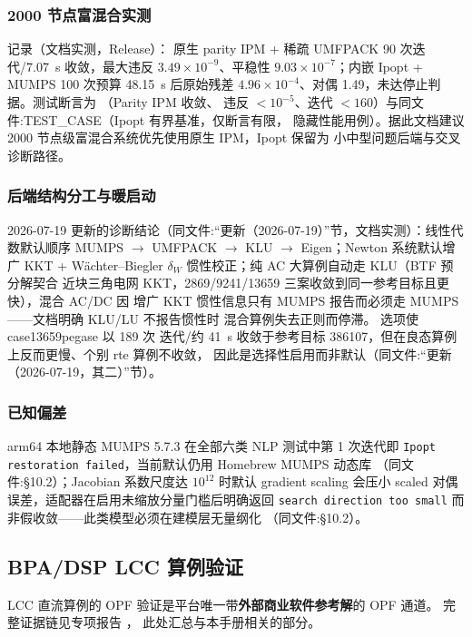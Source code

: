 \subsubsection*{2000 节点富混合实测}
 记录（文档实测，Release）：
原生 parity IPM + 稀疏 UMFPACK 90 次迭代/7.07~s 收敛，最大违反
$3.49\times10^{-9}$、平稳性 $9.03\times10^{-7}$；内嵌 Ipopt + MUMPS 100 次预算
48.15~s 后原始残差 $4.96\times10^{-4}$、对偶 1.49，未达停止判据。测试断言为
（Parity IPM 收敛、
违反 $<10^{-5}$、迭代 $<160$）与同文件:TEST\_CASE（Ipopt 有界基准，仅断言有限，
隐藏性能用例）。据此文档建议 2000 节点级富混合系统优先使用原生 IPM，Ipopt 保留为
小中型问题后端与交叉诊断路径。

\subsubsection*{后端结构分工与暖启动}
2026-07-19 更新的诊断结论（同文件:“更新（2026-07-19）”节，文档实测）：线性代数默认顺序
MUMPS $\to$ UMFPACK $\to$ KLU $\to$ Eigen；Newton 系统默认增广 KKT +
W\"achter--Biegler $\delta_W$ 惯性校正；纯 AC 大算例自动走 KLU（BTF 预分解契合
近块三角电网 KKT，2869/9241/13659 三案收敛到同一参考目标且更快），混合 AC/DC 因
增广 KKT 惯性信息只有 MUMPS 报告而必须走 MUMPS——文档明确 KLU/LU 不报告惯性时
混合算例失去正则而停滞。 选项使 case13659pegase 以 189 次
迭代/约 41~s 收敛于参考目标 386107，但在良态算例上反而更慢、个别 rte 算例不收敛，
因此是选择性启用而非默认（同文件:“更新（2026-07-19，其二）”节）。

\subsubsection*{已知偏差}
arm64 本地静态 MUMPS 5.7.3 在全部六类 NLP 测试中第 1 次迭代即
\texttt{Ipopt restoration failed}，当前默认仍用 Homebrew MUMPS 动态库
（同文件:§10.2）；Jacobian 系数尺度达 $10^{12}$ 时默认 gradient
scaling 会压小 scaled 对偶误差，适配器在启用未缩放分量门槛后明确返回
\texttt{search direction too small} 而非假收敛——此类模型必须在建模层无量纲化
（同文件:§10.2）。

\subsection{BPA/DSP LCC 算例验证}\label{subsec:ver:lcc}

LCC 直流算例的 OPF 验证是平台唯一带\textbf{外部商业软件参考解}的 OPF 通道。
完整证据链见专项报告
，
此处汇总与本手册相关的部分。

